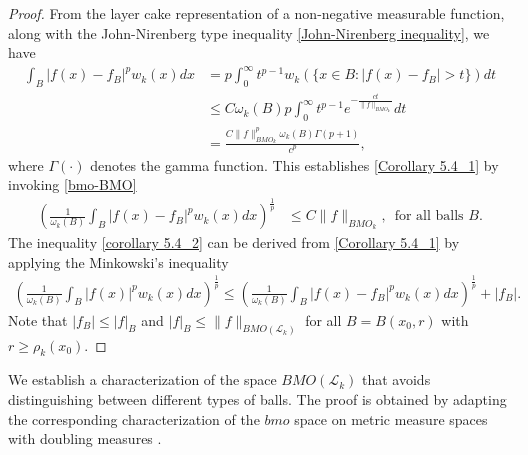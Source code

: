 \documentclass[11pt, reqno]{amsproc}
\theoremstyle{definition}
\theoremstyle{remark}
\numberwithin{equation}{section}
\begin{document}
\begin{proof}
    From the layer cake representation of a non-negative measurable function, along with the John-Nirenberg type inequality \eqref{John-Nirenberg inequality}, we have 
    \begin{align*}
        \int_B |f(x)-f_B|^pw_k(x)dx & = p \int_0^\infty t^{p-1} w_k\left( \{x\in B: |f(x)-f_B| > t \} \right)dt \\
        & \leq C \omega_k(B) p \int_0^\infty t^{p-1}e^{-\frac{ct}{\|f\|_{BMO_k}}} dt \\
        & = \frac{C \|f\|_{BMO_k}^p \omega_k(B)\Gamma(p+1)}{c^p}, 
    \end{align*} where $\Gamma(\cdot)$ denotes the gamma function. This establishes \eqref{Corollary 5.4_1} by invoking \eqref{bmo-BMO}
    \begin{align*}
         \left(\frac{1}{\omega_k(B)} \int_B |f(x)-f_B|^pw_k(x)dx \right)^{\frac{1}{p}} & \leq C\|f\|_{BMO_k}, \,\text{  for all balls } B.   
    \end{align*}The inequality \eqref{corollary 5.4_2} can be derived from \eqref{Corollary 5.4_1} by applying the Minkowski's inequality
    \begin{align*}
          \left(\frac{1}{\omega_k(B)} \int_B |f(x)|^p w_k(x)dx  \right)^{\frac{1}{p}} \leq \left(\frac{1}{\omega_k(B)} \int_B |f(x)-f_B|^p  w_k(x)dx \right)^{\frac{1}{p}} + |f_B|.
    \end{align*}
    Note that $|f_B| \leq |f|_B$ and $|f|_B \leq \|f\|_{BMO(\mathcal{L}_k)}$ for all $B=B(x_0,r)$ with $r\geq{\rho_k}(x_0)$.
\end{proof}
We establish a characterization of the space $BMO(\mathcal{L}_k)$ that avoids distinguishing between different types of balls. The proof is obtained by adapting the corresponding characterization of the $bmo$ space on metric measure spaces with doubling measures \cite{Dafni-2012}.
\end{document}
